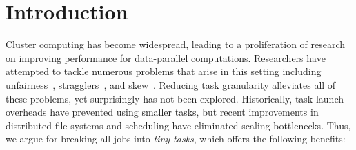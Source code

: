 \section{Introduction}
Cluster computing has become widespread, leading to a proliferation of
research on improving performance for data-parallel computations. 
Researchers have attempted
to tackle numerous problems that arise in this setting 
including unfairness~\cite{ananthanarayanan2012true,hindman2011mesos,isard2009quincy,zaharia2008improving}, stragglers~\cite{ananthanarayanan2012why,ananthanarayanan2010reining}, and skew~\cite{ananthanarayanan2011scarlett,gufler2012load,kwon2012skewtune}.
Reducing task granularity alleviates all of these problems, yet surprisingly has
not been explored.
Historically, task launch overheads have prevented using smaller tasks,
but recent improvements in distributed file systems and
scheduling have eliminated scaling bottlenecks.
Thus, we argue for
breaking all jobs into \emph{tiny tasks}, which offers the following benefits:

